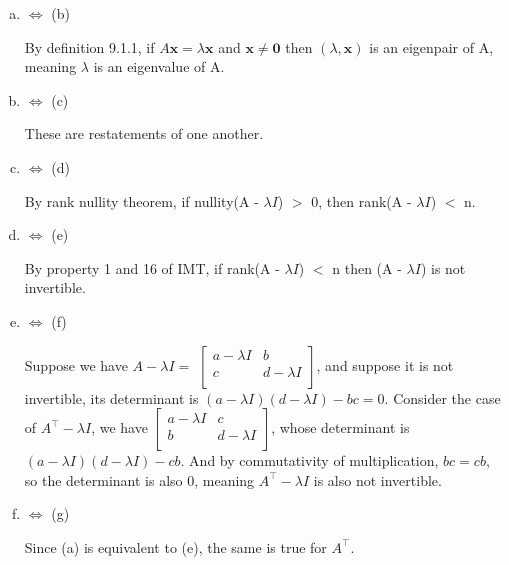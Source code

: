 \documentclass[12pt, letterpaper]{article}
\begin{document}
\begin{enumerate}[(a)]
    \item $\Leftrightarrow$ (b) 
    
    By definition 9.1.1, if $A\mathbf{x}=\lambda\mathbf{x}$ and $\mathbf{x}\neq\mathbf{0}$ then $(\lambda,\mathbf{x})$
    is an eigenpair of A, meaning $\lambda$ is an eigenvalue of A.
    \item $\Leftrightarrow$ (c)
    
    These are restatements of one another.
    \item $\Leftrightarrow$ (d)
    
    By rank nullity theorem, if nullity(A - $\lambda I$) $>$ 0, then rank(A - $\lambda I$) $<$ n.
    \item $\Leftrightarrow$ (e) 
    
    By property 1 and 16 of IMT, if rank(A - $\lambda I$) $<$ n then (A - $\lambda I$) is not invertible.
    \item $\Leftrightarrow$ (f)
    
    Suppose we have $A - \lambda I = $ 
    $\begin{bmatrix}
        a - \lambda I & b  \\
        c & d - \lambda I  \\
    \end{bmatrix}$, 
    and suppose it is not invertible, its determinant is $(a - \lambda I)(d - \lambda I) - bc = 0$. Consider the case of $A^\top - \lambda I$, we have 
    $\begin{bmatrix}
        a - \lambda I & c  \\
        b & d - \lambda I  \\
    \end{bmatrix}$, 
    whose determinant is $(a - \lambda I)(d - \lambda I) - cb$. And by commutativity of multiplication, $bc = cb$, so the determinant is also 0, meaning $A^\top - \lambda I$ is also not invertible.



    \item $\Leftrightarrow$ (g)
    
    Since (a) is equivalent to (e), the same is true for $A^\top$.
\end{enumerate}
\end{document}
